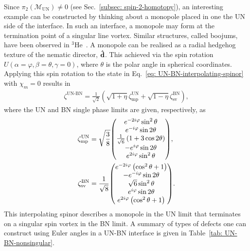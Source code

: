 Since \(\pi_2(\mathcal{M}_\text{UN}) \neq 0\) (see
Sec.~\ref{subsec: spin-2-homotopy}), an interesting example can be
constructed by thinking about a monopole placed in one the UN side of the
interface.
In such an interface, a monopole may form at the termination point of a singular
line vortex.
Similar structures, called boojums, have been observed in
\(^3\)He~\cite{Volovik2009, Blaauwgeers2002}.
A monopole can be realised as a radial hedgehog texture of the nematic director,
\(\vb{\hat{d}}\).
This achieved via the spin rotation \(U(\alpha=\varphi, \beta=\theta,
\gamma=0)\), where \(\theta\) is the polar angle in spherical coordinates.
Applying this spin rotation to the state in
Eq.~\eqref{eq: UN-BN-interpolating-spinor} with \(\chi_m=0\) results in
\begin{align}
    \zeta^\text{UN-BN}=\frac{1}{\sqrt{2}}\left(
        \sqrt{1+\eta}\zeta^\text{UN}_\text{mp} + 
        \sqrt{1-\eta}\zeta^\text{BN}_\text{sv}
        \right),
\end{align}
where the UN and BN single phase limits are given, respectively, as
\begin{align}
    \zeta^\text{UN}_\text{mp} &= \sqrt{\frac{3}{8}}
    \mqty(
        e^{-2i\varphi}\sin^2\theta \\
        e^{-i\varphi}\sin 2 \theta \\
        \frac{1}{\sqrt{6}}\left(1+3\cos 2\theta\right) \\
        -e^{i\varphi} \sin 2 \theta \\
        e^{2i\varphi}\sin^2\theta
    ), \\
    \zeta^\text{BN}_\text{sv} &= \frac{1}{\sqrt{8}}
    \mqty(
        e^{-2i\varphi}\left(\cos^2\theta + 1\right) \\
        - e^{-i\varphi}\sin 2 \theta \\
        \sqrt{6}\sin^2\theta \\
        e^{i\varphi}\sin 2 \theta \\
        e^{2i\varphi}\left(\cos^2\theta + 1\right)          
    ).
\end{align}
This interpolating spinor describes a monopole in the UN limit that terminates
on a singular spin vortex in the BN limit.
A summary of types of defects one can construct using Euler angles in a UN-BN
interface is given in Table~\ref{tab: UN-BN-nonsingular}.
